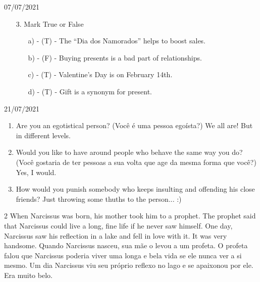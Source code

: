 \documentclass{SchoolBook}
\begin{document}
\begin{day}{07/07/2021}
\begin{enumerate}
            \item[3.] Mark True or False
            \begin{enumerate}
                \item[a)] - (T) - The ``Dia dos Namorados'' helps to boost sales.
                \item[b)] - (F) - Buying presents is a bad part of relationships.
                \item[c)] - (T) - Valentine's Day is on February 14th.
                \item[d)] - (T) - Gift is a synonym for present.
            \end{enumerate}
        \end{enumerate}
    \end{day}
    
    \begin{day}{21/07/2021}
        \begin{enumerate}
            \item Are you an egotistical person? (Você é uma pessoa egoísta?)
            \response We all are! But in different levels.
            
            \item Would you like to have around people who behave the same way you do? (Você gostaria de ter pessoas a sua volta que age da mesma forma que você?)
            \response Yes, I would.
            
            \item How would you punish somebody who keeps insulting and offending his close friends?
            \response Just throwing some thuths to the person... :)
        \end{enumerate}
        
        \begin{multicols} 2
            When Narcissus was born, his mother took him to a prophet. The prophet said that Narcissus could live a long, fine life if he never saw himself. One day, Narcissus saw his reflection in a lake and fell in love with it. It was very handsome.
            \cbreak
            Quando Narcissus nasceu, sua mãe o levou a um profeta. O profeta falou que Narcissus poderia viver uma longa e bela vida se ele nunca ver a si mesmo. Um dia Narcissus viu seu próprio reflexo no lago e se apaixonou por ele. Era muito belo.
        \end{multicols}
    \end{day}
    
\end{document}
